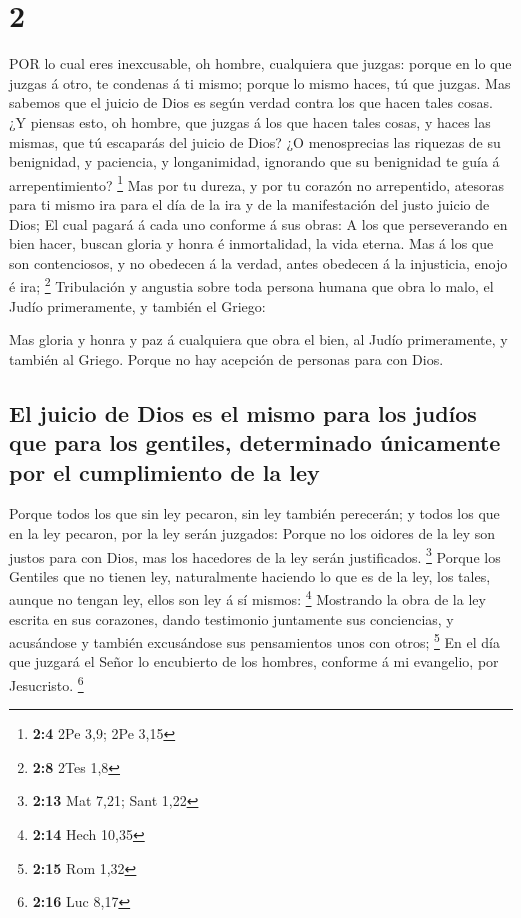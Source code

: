 \hypertarget{section-1}{%
\section{2}\label{section-1}}

 POR lo cual eres inexcusable, oh hombre, cualquiera que
juzgas: porque en lo que juzgas á otro, te condenas á ti mismo; porque
lo mismo haces, tú que juzgas.  Mas sabemos que el juicio de
Dios es según verdad contra los que hacen tales cosas.  ¿Y
piensas esto, oh hombre, que juzgas á los que hacen tales cosas, y haces
las mismas, que tú escaparás del juicio de Dios?  ¿O
menosprecias las riquezas de su benignidad, y paciencia, y longanimidad,
ignorando que su benignidad te guía á arrepentimiento? \footnote{\textbf{2:4}
  2Pe 3,9; 2Pe 3,15}  Mas por tu dureza, y por tu corazón no
arrepentido, atesoras para ti mismo ira para el día de la ira y de la
manifestación del justo juicio de Dios;  El cual pagará á
cada uno conforme á sus obras:  A los que perseverando en
bien hacer, buscan gloria y honra é inmortalidad, la vida eterna.
 Mas á los que son contenciosos, y no obedecen á la verdad,
antes obedecen á la injusticia, enojo é ira; \footnote{\textbf{2:8} 2Tes
  1,8}  Tribulación y angustia sobre toda persona humana que
obra lo malo, el Judío primeramente, y también el Griego:

 Mas gloria y honra y paz á cualquiera que obra el bien, al
Judío primeramente, y también al Griego.  Porque no hay
acepción de personas para con Dios.

\hypertarget{el-juicio-de-dios-es-el-mismo-para-los-juduxedos-que-para-los-gentiles-determinado-uxfanicamente-por-el-cumplimiento-de-la-ley}{%
\subsection{El juicio de Dios es el mismo para los judíos que para los
gentiles, determinado únicamente por el cumplimiento de la
ley}\label{el-juicio-de-dios-es-el-mismo-para-los-juduxedos-que-para-los-gentiles-determinado-uxfanicamente-por-el-cumplimiento-de-la-ley}}

 Porque todos los que sin ley pecaron, sin ley también
perecerán; y todos los que en la ley pecaron, por la ley serán juzgados:
 Porque no los oidores de la ley son justos para con Dios,
mas los hacedores de la ley serán justificados. \footnote{\textbf{2:13}
  Mat 7,21; Sant 1,22}  Porque los Gentiles que no tienen
ley, naturalmente haciendo lo que es de la ley, los tales, aunque no
tengan ley, ellos son ley á sí mismos: \footnote{\textbf{2:14} Hech
  10,35}  Mostrando la obra de la ley escrita en sus
corazones, dando testimonio juntamente sus conciencias, y acusándose y
también excusándose sus pensamientos unos con otros; \footnote{\textbf{2:15}
  Rom 1,32}  En el día que juzgará el Señor lo encubierto
de los hombres, conforme á mi evangelio, por Jesucristo. \footnote{\textbf{2:16}
  Luc 8,17}

